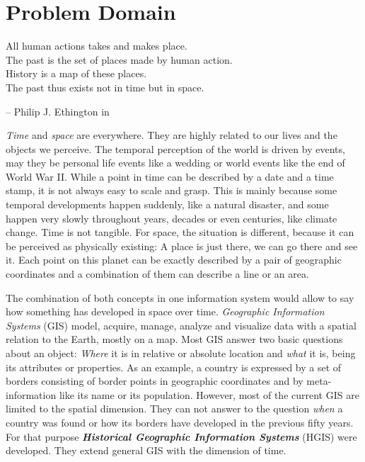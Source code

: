
\section{Problem Domain} %
\label{sec:problem_domain}

\begin{quoteit}
  All human actions takes and makes place. \\
  The past is the set of places made by human action. \\
  History is a map of these places. \\
  The past thus exists not in time but in space.
\end{quoteit}
\hfill -- Philip J. Ethington in \cite[précis]{citeTakeMakePlace}

\emph{Time} and \emph{space} are everywhere. They are highly related to our lives and the objects we perceive. The temporal perception of the world is driven by events, may they be personal life events like a wedding or world events like the end of World War II. While a point in time can be described by a date and a time stamp, it is not always easy to scale and grasp. This is mainly because some temporal developments happen suddenly, like a natural disaster, and some happen very slowly throughout years, decades or even centuries, like climate change. Time is not tangible. For space, the situation is different, because it can be perceived as physically existing: A place is just there, we can go there and see it. Each point on this planet can be exactly described by a pair of geographic coordinates and a combination of them can describe a line or an area.

The combination of both concepts in one information system would allow to say how something has developed in space over time. \emph{Geographic Information Systems} (GIS) model, acquire, manage, analyze and visualize data with a spatial relation to the Earth, mostly on a map. Most GIS answer two basic questions about an object: \emph{Where} it is in relative or absolute location and \emph{what} it is, being its attributes or properties. As an example, a country is expressed by a set of borders consisting of border points in geographic coordinates and by meta-information like its name or its population. However, most of the current GIS are limited to the spatial dimension. They can not answer to the question \emph{when} a country was found or how its borders have developed in the previous fifty years. For that purpose \textbf{\emph{Historical Geographic Information Systems}} (HGIS) were developed. They extend general GIS with the dimension of time.

